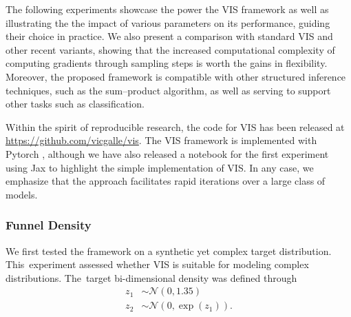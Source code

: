 
{The following experiments showcase the power the VIS framework as well as illustrating the the impact of various parameters on its performance, guiding their 
choice in practice. We 
also present a comparison with standard VIS
and other recent variants, showing that the increased computational complexity of computing
gradients through sampling steps is worth the gains in flexibility.
Moreover, the proposed framework is compatible with other structured inference techniques, such as the sum--product algorithm, as well as serving to support other tasks such as  classification}.

Within the spirit of reproducible research, 
the code for VIS has been released at %
\url{https://github.com/vicgalle/vis}. 
The VIS framework is implemented with Pytorch \parencite{paszke2017automatic}, although we have also released a notebook for the first experiment using Jax to highlight the simple implementation of VIS.
In any case, we emphasize that the approach facilitates 
rapid iterations over a large class of models. 

\subsubsection*{Funnel Density}

We first tested the framework on a synthetic yet complex target distribution. This~experiment assessed whether VIS is
suitable for modeling complex distributions. The~target bi-dimensional density was defined through
\begin{align*}
    z_1 &\sim \mathcal{N}(0, 1.35) \\
    z_2 &\sim \mathcal{N}(0, \exp(z_1)).
\end{align*}



